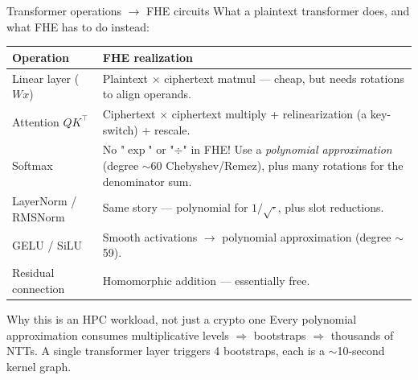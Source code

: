 \documentclass[aspectratio=169]{beamer}
\begin{document}
\begin{frame}{Transformer operations $\to$ FHE circuits}
  What a plaintext transformer does, and what FHE has to do instead:
  \vspace{0.4em}
  \scriptsize
  \begin{tabular}{@{}p{3.4cm}p{8.1cm}@{}}
    \toprule
    \textbf{Operation} & \textbf{FHE realization} \\
    \midrule
    Linear layer ($W x$) & Plaintext $\times$ ciphertext matmul — cheap, but needs
                           rotations to align operands. \\
    Attention $QK^\top$  & Ciphertext $\times$ ciphertext multiply + relinearization
                           (a key-switch) + rescale. \\
    Softmax              & No "$\exp$" or "$\div$" in FHE! Use a \emph{polynomial approximation}
                           (degree $\sim$60 Chebyshev/Remez), plus many rotations for the
                           denominator sum. \\
    LayerNorm / RMSNorm  & Same story — polynomial for $1/\sqrt{\cdot}$, plus slot reductions. \\
    GELU / SiLU          & Smooth activations $\to$ polynomial approximation
                           (degree $\sim$59). \\
    Residual connection  & Homomorphic addition — essentially free. \\
    \bottomrule
  \end{tabular}
  \normalsize
  \vspace{0.6em}
  \begin{alertblock}{Why this is an HPC workload, not just a crypto one}
    \footnotesize
    Every polynomial approximation consumes multiplicative levels $\Rightarrow$
    bootstraps $\Rightarrow$ thousands of NTTs. A single transformer layer
    triggers 4 bootstraps, each is a $\sim$10-second kernel graph.
  \end{alertblock}
\end{frame}
\end{document}
